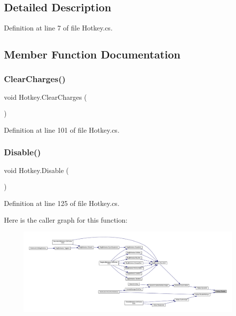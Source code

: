 \subsection{Detailed Description}


Definition at line 7 of file Hotkey.\+cs.



\subsection{Member Function Documentation}
\mbox{\label{class_hotkey_a7d290d1777e2971d3bbf99d23322d4af}} 
\subsubsection{\texorpdfstring{ClearCharges()}{ClearCharges()}}
{\footnotesize\ttfamily void Hotkey.\+Clear\+Charges (\begin{DoxyParamCaption}{ }\end{DoxyParamCaption})}



Definition at line 101 of file Hotkey.\+cs.

\mbox{\label{class_hotkey_a0b90f1841f8cbe70bf62447affd70bd1}} 
\subsubsection{\texorpdfstring{Disable()}{Disable()}}
{\footnotesize\ttfamily void Hotkey.\+Disable (\begin{DoxyParamCaption}{ }\end{DoxyParamCaption})}



Definition at line 125 of file Hotkey.\+cs.

Here is the caller graph for this function\+:
\nopagebreak
\begin{figure}[H]
\begin{center}
\leavevmode
\includegraphics[width=350pt]{class_hotkey_a0b90f1841f8cbe70bf62447affd70bd1_icgraph}
\end{center}
\end{figure}
\mbox{\label{class_hotkey_ae078d4716dbd3a3c703a3ef341e56562}} 
